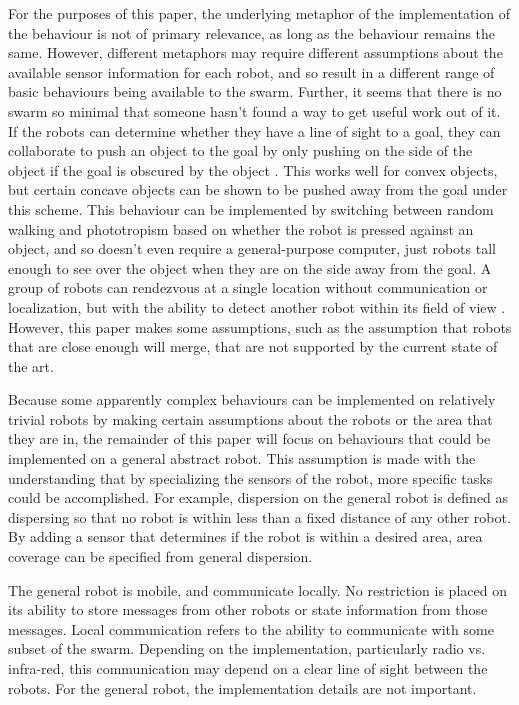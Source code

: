 \documentclass[]{article}
\begin{document}
For the purposes of this paper, the underlying metaphor of the implementation of the behaviour is not of primary relevance, as long as the behaviour remains the same. 
However, different metaphors may require different assumptions about the available sensor information for each robot, and so result in a different range of basic behaviours being available to the swarm. 
Further, it seems that there is no swarm so minimal that someone hasn't found a way to get useful work out of it.  
If the robots can determine whether they have a line of sight to a goal, they can collaborate to push an object to the goal by only pushing on the side of the object if the goal is obscured by the object \cite{chen2015occlusion}. This works well for convex objects, but certain concave objects can be shown to be pushed away from the goal under this scheme. 
This behaviour can be implemented by switching between random walking and phototropism based on whether the robot is pressed against an object, and so doesn't even require a general-purpose computer, just robots tall enough to see over the object when they are on the side away from the goal. 
A group of robots can rendezvous at a single location without communication or localization, but with the ability to detect another robot within its field of view \cite{yu2012rendezvous}. However, this paper makes some assumptions, such as the assumption that robots that are close enough will merge, that are not supported by the current state of the art. 

Because some apparently complex behaviours can be implemented on relatively trivial robots by making certain assumptions about the robots or the area that they are in, the remainder of this paper will focus on behaviours that could be implemented on a general abstract robot. 
This assumption is made with the understanding that by specializing the sensors of the robot, more specific tasks could be accomplished. 
For example, dispersion on the general robot is defined as dispersing so that no robot is within less than a fixed distance of any other robot. 
By adding a sensor that determines if the robot is within a desired area, area coverage can be specified from general dispersion. 
 
The general robot is mobile, and communicate locally. 
No restriction is placed on its ability to store messages from other robots or state information from those messages. 
Local communication refers to the ability to communicate with some subset of the swarm.
Depending on the implementation, particularly radio vs. infra-red, this communication may depend on a clear line of sight between the robots.
For the general robot, the implementation details are not important. 
\end{document}
